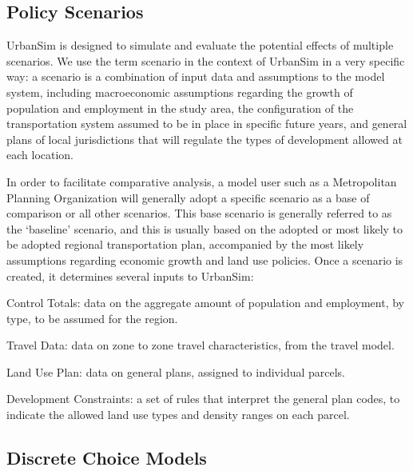 \subsection{Policy Scenarios}

UrbanSim is designed to simulate and evaluate the potential effects of multiple scenarios.  We use the term scenario in the context of UrbanSim in a very
specific way: a scenario is a combination of input data and assumptions to the model system, including macroeconomic assumptions regarding the growth of population and employment in the study area, the configuration of the transportation system assumed to be in place in specific future years, and
general plans of local jurisdictions that will regulate the types of development allowed at each location.

In order to facilitate comparative analysis, a model user such as a Metropolitan Planning Organization will generally adopt a specific scenario as a base of comparison or all other scenarios.  This base scenario is generally referred to as the `baseline' scenario, and this is usually based on the adopted or most
likely to be adopted regional transportation plan, accompanied by the most likely assumptions regarding economic growth and land use policies.  Once a  scenario is created, it determines several inputs to UrbanSim:

\squishlist
\item Control Totals: data on the aggregate amount of population and employment, by type, to be assumed for the region.
\item Travel Data: data on zone to zone travel characteristics, from the travel model.
\item Land Use Plan: data on general plans, assigned to individual parcels.
\item Development Constraints: a set of rules that interpret the general plan codes, to indicate the allowed land use types and density ranges on each parcel.
\squishend

\subsection{Discrete Choice Models}
\label{sec:discrete-choice}

